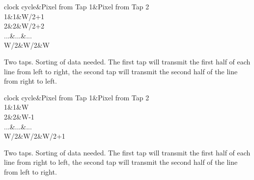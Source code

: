 \begin{Desc}
\begin{description}
\begin{TabularC}{3}
\hline
clock cycle&Pixel from Tap 1&Pixel from Tap 2 \\
1&1&W/2+1 \\
2&2&W/2+2 \\
...&...&... \\
W/2&W/2&W \\
\end{TabularC}
\item[{\em 
\hypertarget{group___device_specific_interface_gga25ba65893f1ee0e7de99cb51bb858d99a97ba6c2f4d81c999d2d561c3f8a58429}{cltxg2\+X\+E}\label{group___device_specific_interface_gga25ba65893f1ee0e7de99cb51bb858d99a97ba6c2f4d81c999d2d561c3f8a58429}
}]Two taps. Sorting of data needed. The first tap will transmit the first half of each line from left to right, the second tap will transmit the second half of the line from right to left.

\begin{TabularC}{3}
\hline
clock cycle&Pixel from Tap 1&Pixel from Tap 2 \\
1&1&W \\
2&2&W-\/1 \\
...&...&... \\
W/2&W/2&W/2+1 \\
\end{TabularC}
\item[{\em 
\hypertarget{group___device_specific_interface_gga25ba65893f1ee0e7de99cb51bb858d99a47d1f06bb78c34002d6898311e202e42}{cltxg2\+X\+M}\label{group___device_specific_interface_gga25ba65893f1ee0e7de99cb51bb858d99a47d1f06bb78c34002d6898311e202e42}
}]Two taps. Sorting of data needed. The first tap will transmit the first half of each line from right to left, the second tap will transmit the second half of the line from left to right.


\end{description}
\end{Desc}
